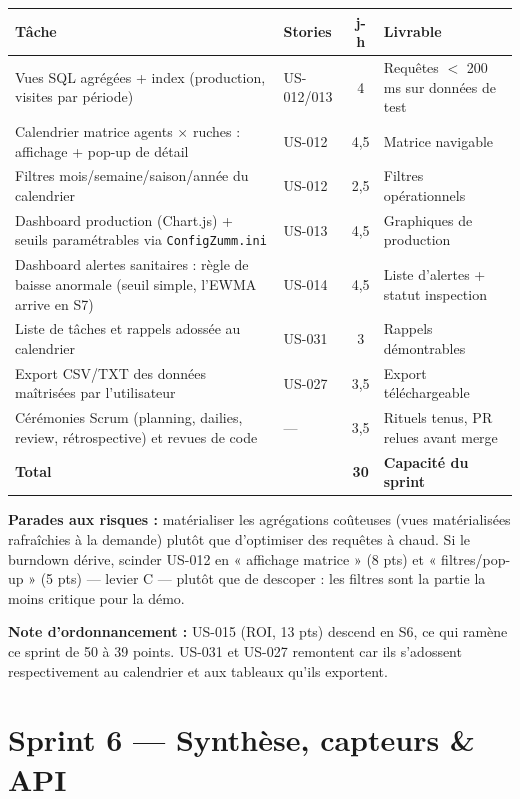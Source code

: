 \begin{center}
\small
\begin{tabular}{p{7.2cm}lcp{4.6cm}}
\toprule
\textbf{Tâche} & \textbf{Stories} & \textbf{j-h} & \textbf{Livrable} \\
\midrule
Vues SQL agrégées + index (production, visites par période) & US-012/013 & 4 & Requêtes $<$ 200 ms sur données de test \\
Calendrier matrice agents $\times$ ruches : affichage + pop-up de détail & US-012 & 4,5 & Matrice navigable \\
Filtres mois/semaine/saison/année du calendrier & US-012 & 2,5 & Filtres opérationnels \\
Dashboard production (Chart.js) + seuils paramétrables via
\texttt{ConfigZumm.ini} & US-013 & 4,5 & Graphiques de production \\
Dashboard alertes sanitaires : règle de baisse anormale (seuil simple,
l'EWMA arrive en S7) & US-014 & 4,5 & Liste d'alertes + statut inspection \\
Liste de tâches et rappels adossée au calendrier & US-031 & 3 & Rappels démontrables \\
Export CSV/TXT des données maîtrisées par l'utilisateur & US-027 & 3,5 & Export téléchargeable \\
\addlinespace
Cérémonies Scrum (planning, dailies, review, rétrospective) et
revues de code & --- & 3,5 & Rituels tenus, PR relues avant merge \\
\midrule
\textbf{Total} & & \textbf{30} & \textbf{Capacité du sprint} \\
\bottomrule
\end{tabular}
\end{center}

\textbf{Parades aux risques :} matérialiser les agrégations coûteuses
(vues matérialisées rafraîchies à la demande) plutôt que d'optimiser des
requêtes à chaud. Si le burndown dérive, scinder US-012 en « affichage
matrice » (8 pts) et « filtres/pop-up » (5 pts) --- levier C --- plutôt que
de descoper : les filtres sont la partie la moins critique pour la démo.

\textbf{Note d'ordonnancement :} US-015 (ROI, 13 pts) descend en S6, ce qui
ramène ce sprint de 50 à 39 points. US-031 et US-027 remontent car ils
s'adossent respectivement au calendrier et aux tableaux qu'ils exportent.

\section{Sprint 6 --- Synthèse, capteurs \& API}


